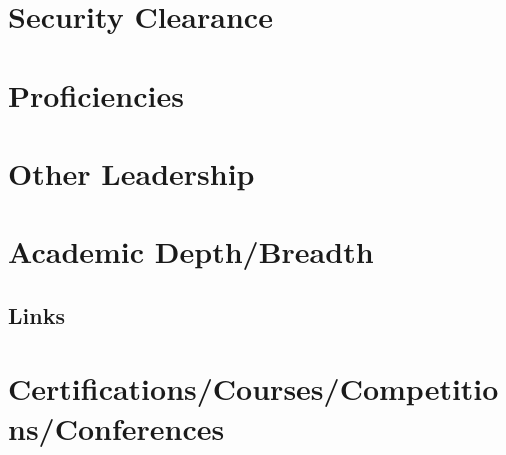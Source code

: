 \documentclass[letterpaper]{deedy-resume}
\begin{document}
\begin{minipage}[t]{0.35\textwidth}


\section{Security Clearance} 


\sectionspace



\section{Proficiencies}


\sectionspace


\sectionspace


\sectionspace


\sectionspace


\section{Other Leadership} 


\sectionspace


\section{Academic Depth/Breadth}




\begin{multicols}{2}

\vspace*{3pt}
\section{Links}


\columnbreak

\vspace*{0pt}


\end{multicols}



\end{minipage}


\section{Certifications/Courses/Competitions/Conferences}

\end{document}

